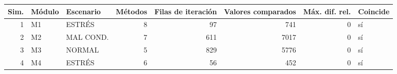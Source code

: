 {\footnotesize
\begin{longtable}{rllrrrrl}
\toprule
\textbf{Sim.} & \textbf{Módulo} & \textbf{Escenario} & \textbf{Métodos} & \textbf{Filas de iteración} & \textbf{Valores comparados} & \textbf{Máx. dif. rel.} & \textbf{Coincide} \\
\midrule
\endhead
1 & M1 & ESTRÉS & 8 & 97 & 741 & 0 & sí \\
2 & M2 & MAL COND. & 7 & 611 & 7017 & 0 & sí \\
3 & M3 & NORMAL & 5 & 829 & 5776 & 0 & sí \\
4 & M4 & ESTRÉS & 6 & 56 & 452 & 0 & sí \\
\bottomrule
\end{longtable}
}
